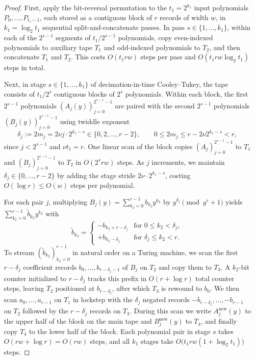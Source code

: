 \begin{proof}
First, apply the bit-reversal permutation to the $t_1 = 2^{k_1}$ input polynomials $P_0, \dots, P_{t_1-1}$, each stored as a contiguous block of $r$ records of width $w$, in $k_1 = \log_2 t_1$ sequential split-and-concatenate passes. In pass $s \in \{1, \dots, k_1\}$, within each of the $2^{s-1}$ segments of $t_1 / 2^{s-1}$ polynomials, copy even-indexed polynomials to auxiliary tape $T_1$ and odd-indexed polynomials to $T_2$, and then concatenate $T_1$ and $T_2$. This costs $O(t_1 r w)$ steps per pass and $O(t_1 r w \log_2 t_1)$ steps in total.

Next, in stage $s \in \{1, \dots, k_1\}$ of decimation-in-time Cooley--Tukey, the tape consists of $t_1 / 2^s$ contiguous blocks of $2^s$ polynomials. Within each block, the first $2^{s-1}$ polynomials $(A_j(y))_{j=0}^{2^{s-1}-1}$ are paired with the second $2^{s-1}$ polynomials $(B_j(y))_{j=0}^{2^{s-1}-1}$ using twiddle exponent
\[
  \delta_j := 2m_j = 2\nu j \cdot 2^{k_1 - s} \in \{0, 2, \dots, r - 2\}, \qquad 0 \le 2m_j \le r - 2\nu 2^{k_1 - s} < r,
\]
since $j < 2^{s-1}$ and $\nu t_1 = r$. One linear scan of the block copies $(A_j)_{j=0}^{2^{s-1}-1}$ to $T_1$ and $(B_j)_{j=0}^{2^{s-1}-1}$ to $T_2$ in $O(2^s r w)$ steps. As $j$ increments, we maintain $\delta_j \in \{0, \dots, r-2\}$ by adding the stage stride $2\nu \cdot 2^{k_1 - s}$, costing $O(\log r) \le O(w)$ steps per polynomial.

For each pair $j$, multiplying $B_j(y) = \sum_{k_2=0}^{r-1} b_{k_2} y^{k_2}$ by $y^{\delta_j} \pmod{y^r + 1}$ yields $\sum_{k_2=0}^{r-1} \tilde{b}_{k_2} y^{k_2}$ with
\[
  \tilde{b}_{k_2} = \begin{cases} -b_{k_2 + r - \delta_j} & \text{for } 0 \le k_2 < \delta_j, \\ +b_{k_2 - \delta_j} & \text{for } \delta_j \le k_2 < r. \end{cases}
\]
To stream $(\tilde{b}_{k_2})_{k_2=0}^{r-1}$ in natural order on a Turing machine, we scan the first $r - \delta_j$ coefficient records $b_0, \dots, b_{r - \delta_j - 1}$ of $B_j$ on $T_2$ and copy them to $T_3$. A $k_2$-bit counter initialized to $r - \delta_j$ tracks this prefix in $O(r + \log r)$ total counter steps, leaving $T_2$ positioned at $b_{r - \delta_j}$, after which $T_3$ is rewound to $b_0$. We then scan $a_0, \dots, a_{r-1}$ on $T_1$ in lockstep with the $\delta_j$ negated records $-b_{r - \delta_j}, \dots, -b_{r-1}$ on $T_2$ followed by the $r - \delta_j$ records on $T_3$. During this scan we write $A_j^{\mathrm{new}}(y)$ to the upper half of the block on the main tape and $B_j^{\mathrm{new}}(y)$ to $T_4$, and finally copy $T_4$ to the lower half of the block. Each polynomial pair in stage $s$ takes $O(r w + \log r) = O(r w)$ steps, and all $k_1$ stages take $O\bigl(t_1 r w (1 + \log_2 t_1)\bigr)$ steps.


\end{proof}
